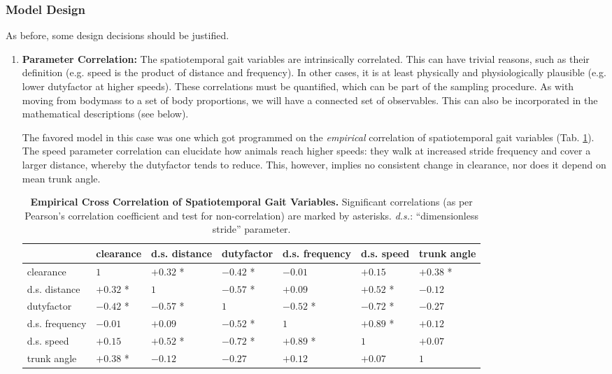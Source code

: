 \subsubsection{Model Design}
\label{sec:org554cfcf}
As before, some design decisions should be justified.

\begin{enumerate}
\item \textbf{Parameter Correlation:}
\label{sec:orgccc0e5d}
The spatiotemporal gait variables are intrinsically correlated.
This can have trivial reasons, such as their definition (e.g. speed is the product of distance and frequency).
In other cases, it is at least physically and physiologically plausible (e.g. lower dutyfactor at higher speeds).
These correlations must be quantified, which can be part of the sampling procedure.
As with moving from bodymass to a set of body proportions, we will have a connected set of observables.
This can also be incorporated in the mathematical descriptions (see below).

The favored model in this case was one which got programmed on the \emph{empirical} correlation of spatiotemporal gait variables (Tab. \ref{tab:stridecorrelation}).
The speed parameter correlation can elucidate how animals reach higher speeds: they walk at increased stride frequency and cover a larger distance, whereby the dutyfactor tends to reduce.
This, however, implies no consistent change in clearance, nor does it depend on mean trunk angle.

\begin{table}[p]
\caption{\label{tab:stridecorrelation}\textbf{Empirical Cross Correlation of Spatiotemporal Gait Variables.} Significant correlations (as per Pearson's correlation coefficient and test for non-correlation) are marked by asterisks. \emph{d.s.}: ``dimensionless stride'' parameter.}
\centering
\begin{footnotesize}
\begin{tabular}{l|llllll}
 & clearance & d.s. distance & dutyfactor & d.s. frequency & d.s. speed & trunk angle\\[0pt]
\hline
clearance & \(1\) & \(+0.32\) * & \(-0.42\) * & \(-0.01\) & \(+0.15\) & \(+0.38\) *\\[0pt]
d.s. distance & \(+0.32\) * & \(1\) & \(-0.57\) * & \(+0.09\) & \(+0.52\) * & \(-0.12\)\\[0pt]
dutyfactor & \(-0.42\) * & \(-0.57\) * & \(1\) & \(-0.52\) * & \(-0.72\) * & \(-0.27\)\\[0pt]
d.s. frequency & \(-0.01\) & \(+0.09\) & \(-0.52\) * & \(1\) & \(+0.89\) * & \(+0.12\)\\[0pt]
d.s. speed & \(+0.15\) & \(+0.52\) * & \(-0.72\) * & \(+0.89\) * & \(1\) & \(+0.07\)\\[0pt]
trunk angle & \(+0.38\) * & \(-0.12\) & \(-0.27\) & \(+0.12\) & \(+0.07\) & \(1\)\\[0pt]
\end{tabular}
\end{footnotesize}
\end{table}




\end{enumerate}
